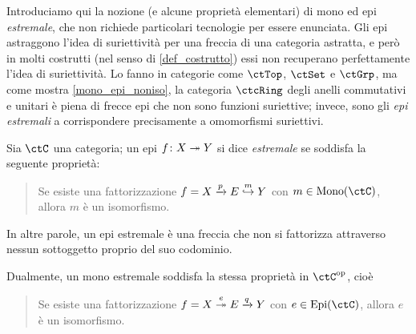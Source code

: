 Introduciamo qui la nozione (e alcune proprietà elementari) di mono ed epi \emph{estremale}, che non richiede particolari tecnologie per essere enunciata. Gli epi astraggono l'idea di suriettività per una freccia di una categoria astratta, e però in molti costrutti (nel senso di \ref{def_costrutto}) essi non recuperano perfettamente l'idea di suriettività. Lo fanno in categorie come \(\ctTop\), \(\ctSet\) e \(\ctGrp\), ma come mostra \ref{mono_epi_noniso}, la categoria \(\ctcRing\) degli anelli commutativi e unitari è piena di frecce epi che non sono funzioni suriettive; invece, sono gli \emph{epi estremali} a corrispondere precisamente a omomorfismi suriettivi.%
\begin{definition}\label{def_monoepi_estrem}
 Sia \(\ctC\) una categoria; un epi \(f \colon X \twoheadrightarrow Y\) si dice \emph{estremale} se soddisfa la seguente proprietà:
 \begin{quote}
  Se esiste una fattorizzazione \(f = X \xrightarrow{p} E \overset m{\hookrightarrow} Y\) con \(m \in\Mono[\ctC]\), allora \(m\) è un isomorfismo.
 \end{quote}
 In altre parole, un epi estremale è una freccia che non si fattorizza attraverso nessun sottoggetto proprio del suo codominio.

 Dualmente, un mono estremale soddisfa la stessa proprietà in \(\ctC^\op\), cioè
 \begin{quote}
  Se esiste una fattorizzazione \(f = X \overset e{\twoheadrightarrow} E \xrightarrow{q} Y\) con \(e \in\Epi[\ctC]\), allora \(e\) è un isomorfismo.
 \end{quote}
\end{definition}
